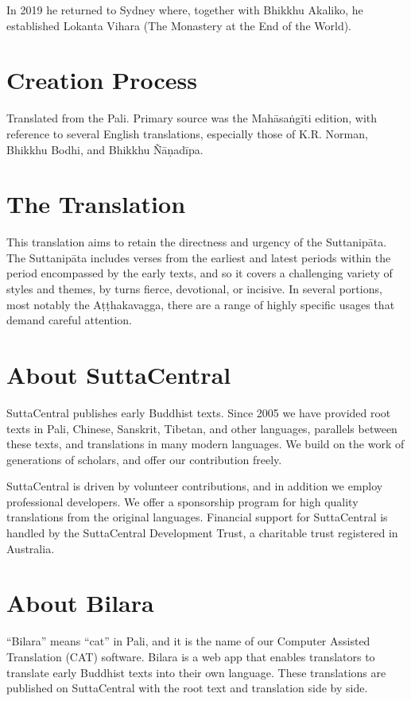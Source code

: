 \documentclass[12pt,openany]{book}%
\begin{document}
In 2019 he returned to Sydney where, together with Bhikkhu Akaliko, he established Lokanta Vihara (The Monastery at the End of the World). 

\section*{Creation Process}

Translated from the Pali. Primary source was the \textsanskrit{Mahāsaṅgīti} edition, with reference to several English translations, especially those of K.R. Norman, Bhikkhu Bodhi, and Bhikkhu \textsanskrit{Ñāṇadīpa}.

\section*{The Translation}

This translation aims to retain the directness and urgency of the \textsanskrit{Suttanipāta}. The \textsanskrit{Suttanipāta} includes verses from the earliest and latest periods within the period encompassed by the early texts, and so it covers a challenging variety of styles and themes, by turns fierce, devotional, or incisive. In several portions, most notably the \textsanskrit{Aṭṭhakavagga}, there are a range of highly specific usages that demand careful attention.

\section*{About SuttaCentral}

SuttaCentral publishes early Buddhist texts. Since 2005 we have provided root texts in Pali, Chinese, Sanskrit, Tibetan, and other languages, parallels between these texts, and translations in many modern languages. We build on the work of generations of scholars, and offer our contribution freely.

SuttaCentral is driven by volunteer contributions, and in addition we employ professional developers. We offer a sponsorship program for high quality translations from the original languages. Financial support for SuttaCentral is handled by the SuttaCentral Development Trust, a charitable trust registered in Australia.

\section*{About Bilara}

“Bilara” means “cat” in Pali, and it is the name of our Computer Assisted Translation (CAT) software. Bilara is a web app that enables translators to translate early Buddhist texts into their own language. These translations are published on SuttaCentral with the root text and translation side by side.
\end{document}
